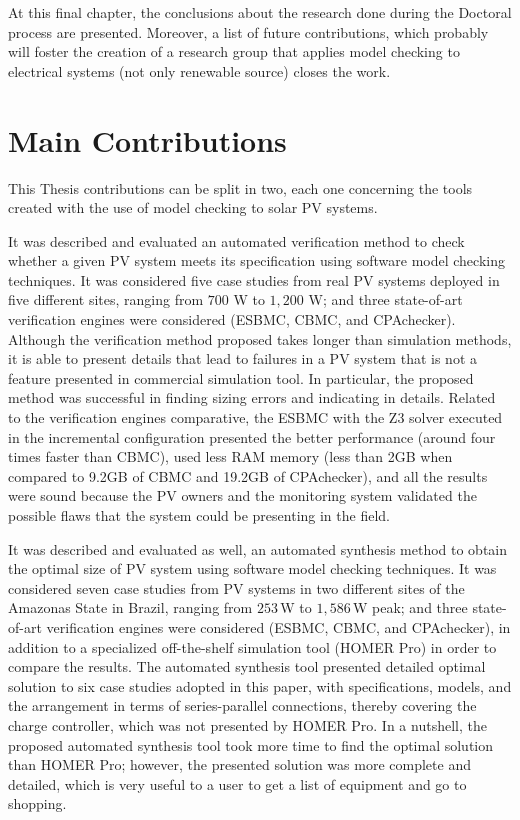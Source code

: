 At this final chapter, the conclusions about the research done during the Doctoral process are presented. Moreover, a list of future contributions, which probably will foster the creation of a research group that applies model checking to electrical systems (not only renewable source) closes the work.

\section{Main Contributions}

This Thesis contributions can be split in two, each one concerning the tools created with the use of model checking to solar PV systems.

It was described and evaluated an automated verification method to check whether a given PV system meets its specification using software model checking techniques. It was considered five case studies from real PV systems deployed in five different sites, ranging from $700$ W to $1,200$ W; and three state-of-art verification engines were considered (ESBMC, CBMC, and CPAchecker). Although the verification method proposed takes longer than simulation methods, it is able to present details that lead to failures in a PV system that is not a feature presented in commercial simulation tool. In particular, the proposed method was successful in finding sizing errors and indicating in details. Related to the verification engines comparative, the ESBMC with the Z3 solver executed in the incremental configuration presented the better performance (around four times faster than CBMC), used less RAM memory (less than 2GB when compared to 9.2GB of CBMC and 19.2GB of CPAchecker), and all the results were sound because the PV owners and the monitoring system validated the possible flaws that the system could be presenting in the field.

It was described and evaluated as well, an automated synthesis method to obtain the optimal size of PV system using software model checking techniques. It was considered seven case studies from PV systems in two different sites of the Amazonas State in Brazil, ranging from $253$\,W to $1,586$\,W peak; and three state-of-art verification engines were considered (ESBMC, CBMC, and CPAchecker), in addition to a specialized off-the-shelf simulation tool (HOMER Pro) in order to compare the results. The automated synthesis tool presented detailed optimal solution to six case studies adopted in this paper, with specifications, models, and the arrangement in terms of series-parallel connections, thereby covering the charge controller, which was not presented by HOMER Pro. In a nutshell, the proposed automated synthesis tool took more time to find the optimal solution than HOMER Pro; however, the presented solution was more complete and detailed, which is very useful to a user to get a list of equipment and go to shopping.


